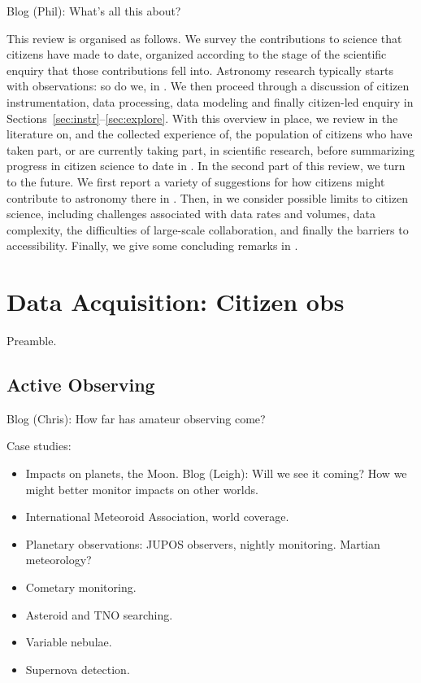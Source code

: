 \documentclass{ar2e}
\begin{document}
Blog (Phil): What's all this about?

This review is organised as follows. We survey the contributions to science that
citizens have made to date, organized according to the stage of the scientific
enquiry that those contributions fell into. Astronomy research typically starts
with observations: so do we, in . We then proceed through a
discussion of citizen instrumentation, data processing, data modeling and
finally citizen-led enquiry in 
Sections~\ref{sec:instr}--\ref{sec:explore}. With this overview in place,
we review in  the literature on, and the collected experience
of, the population of citizens who have taken part, or are currently taking
part, in scientific research, before summarizing progress in citizen science to
date in . In the second part of this review, we turn to the
future. We first report a variety of suggestions for how
citizens might contribute to astronomy there in . Then, in 
 we consider possible limits to citizen science, including
challenges associated with data rates and volumes, data complexity, the
difficulties of large-scale collaboration, and finally the barriers to
accessibility. Finally, we give some concluding remarks in
.



\section{Data Acquisition: Citizen obs}
\label{sec:obs}

Preamble.


\subsection{Active Observing}
\label{sec:obs:active}

Blog (Chris): How far has amateur observing come?

Case studies:
\begin{itemize}
\item Impacts on planets, the Moon. 
Blog (Leigh): Will we see it coming? How
we might better monitor impacts on other worlds. 
\item International Meteoroid Association, world coverage.
\item Planetary observations: JUPOS observers, nightly monitoring. 
        Martian meteorology?
\item Cometary monitoring.
\item Asteroid and TNO searching.
\item Variable nebulae.
\item Supernova detection.
\end{itemize}
\end{document}
